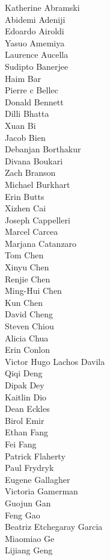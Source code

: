 Katherine Abramski\\
Abidemi Adeniji\\
Edoardo Airoldi\\
Yasuo Amemiya\\
Laurence Aucella\\
Sudipto Banerjee\\
Haim Bar\\
Pierre c Bellec\\
Donald Bennett\\
Dilli Bhatta\\
Xuan Bi\\
Jacob Bien\\
Debanjan Borthakur\\
Divana Boukari\\
Zach Branson\\
Michael Burkhart\\
Erin Butts\\
Xizhen Cai\\
Joseph Cappelleri\\
Marcel Carcea\\
Marjana Catanzaro\\
Tom Chen\\
Xinyu Chen\\
Renjie Chen\\
Ming-Hui  Chen\\
Kun Chen\\
David Cheng\\
Steven Chiou\\
Alicia Chua\\
Erin Conlon\\
Victor Hugo Lachos Davila\\
Qiqi  Deng\\
Dipak Dey\\
Kaitlin Dio\\
Dean Eckles\\
Birol Emir\\
Ethan Fang\\
Fei Fang\\
Patrick Flaherty\\
Paul Frydryk\\
Eugene Gallagher\\
Victoria Gamerman\\
Guojun  Gan\\
Feng Gao\\
Beatriz Etchegaray Garcia\\
Miaomiao Ge\\
Lijiang Geng\\
